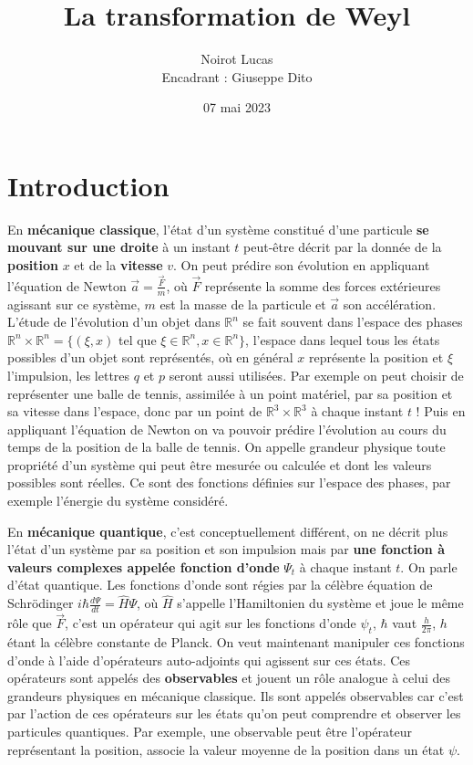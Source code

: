 \documentclass[a4paper, 12pt]{report}
\title{La transformation de Weyl}
\author{Noirot Lucas \\ Encadrant : Giuseppe Dito}
\date{07 mai 2023}
\newcommand{\R}{\mathbb{R}} %
\renewcommand{\.}{\cdot} %
\newcommand\emptypage{
    \null
    \thispagestyle{empty}
    
    \newpage
    }
\theoremstyle{break}
\theoremstyle{remark}
\theoremstyle{proofstyle}
\begin{document}
\maketitle

\emptypage

\chapter*{\centering Introduction}


En \textbf{mécanique classique}, l'état d'un système constitué d'une particule \textbf{se mouvant sur une droite} à un instant $t$ peut-être décrit par la donnée de la \textbf{position} $x$ et de la \textbf{vitesse} $v$. On peut prédire son évolution en appliquant l'équation de Newton $\vec{a} = \frac{\vec{F}}{m}$, où $\vec{F}$ représente la somme des forces extérieures agissant sur ce système, $m$ est la masse de la particule et $\vec{a}$ son accélération. L'étude de l'évolution d'un objet dans $\R^n$ se fait souvent dans l'espace des phases $\R^n \times \R^n = \{(\xi,x)$ tel que $ \xi \in \R^n, x \in \R^n\}$, l'espace dans lequel tous les états possibles d'un objet sont représentés, où en général $x$ représente la position et $\xi$ l'impulsion, les lettres $q$ et $p$ seront aussi utilisées. Par exemple on peut choisir de représenter une balle de tennis, assimilée à un point matériel, par sa position et sa vitesse dans l'espace, donc par un point de $\R^3 \times \R^3$ à chaque instant $t$ ! Puis en appliquant l'équation de Newton on va pouvoir prédire l'évolution au cours du temps de la position de la balle de tennis. On appelle grandeur physique toute propriété d'un système qui peut être mesurée ou calculée et dont les valeurs possibles sont réelles. Ce sont des fonctions définies sur l'espace des phases, par exemple l'énergie du système considéré.\vspace{7pt}

En \textbf{mécanique quantique}, c'est conceptuellement différent, on ne décrit plus l'état d'un système par sa position et son impulsion mais par \textbf{une fonction à valeurs complexes appelée fonction d'onde} $\Psi_t$ à chaque instant $t$.  On parle d'état quantique. Les fonctions d'onde sont régies par la célèbre équation de Schrödinger $i \hbar \frac{d \Psi}{dt}=\hat{H}\Psi$, où $\hat{H}$ s'appelle l'Hamiltonien du système et joue le même rôle que $\vec{F}$, c'est un opérateur qui agit sur les fonctions d'onde $\psi _t$, $\hbar$ vaut $\frac{h}{2 \pi}$, $h$ étant la célèbre constante de Planck. On veut maintenant manipuler ces fonctions d'onde à l'aide d'opérateurs auto-adjoints qui agissent sur ces états. Ces opérateurs sont appelés des \textbf{observables} et jouent un rôle analogue à celui des grandeurs physiques en mécanique classique. Ils sont appelés observables car c'est par l'action de ces opérateurs sur les états qu'on peut comprendre et observer les particules quantiques. Par exemple, une observable peut être l'opérateur représentant la position, associe la valeur moyenne de la position dans un état $\psi$.\vspace{7 pt}
\end{document}
